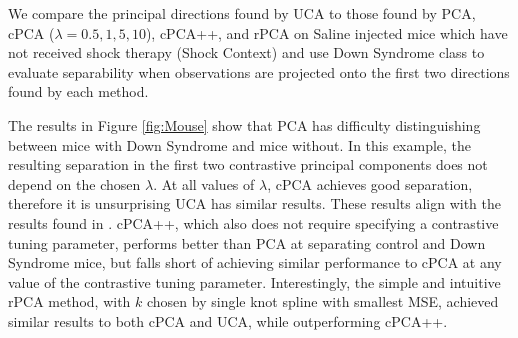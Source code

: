 \documentclass[12pt]{article}
\begin{document}
We compare the principal directions found by UCA to those found by PCA, cPCA ($\lambda = 0.5, 1, 5, 10$), cPCA++, and rPCA on Saline injected mice which have not received shock therapy (Shock Context) and use Down Syndrome class to evaluate separability when observations are projected onto the first two directions found by each method.

The results in Figure \ref{fig:Mouse} show that PCA has difficulty distinguishing between mice with Down Syndrome and mice without.  In this example, the resulting separation in the first two contrastive principal components does not depend on the chosen $\lambda$. At all values of $\lambda$, cPCA achieves good separation, therefore it is unsurprising UCA has similar results. These results align with the results found in  \cite{Abid}.
cPCA++, which also does not require specifying a contrastive tuning parameter, performs better than PCA at separating control and Down Syndrome mice, but falls short of achieving similar performance to cPCA at any value of the contrastive tuning parameter. Interestingly, the simple and intuitive rPCA method, with $k$ chosen by single knot spline with smallest MSE, achieved similar results to both cPCA and UCA, while outperforming cPCA++.
\end{document}

